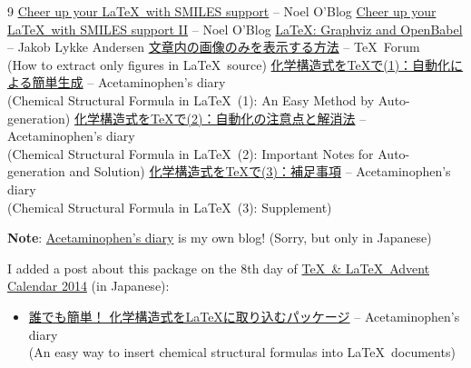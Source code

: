 \documentclass[12pt]{ltjsarticle}
\begin{document}
\begin{thebibliography}{9}
\href{http://baoilleach.blogspot.jp/2012/03/cheer-up-your-latex-with-smiles-support.html}{Cheer up your \LaTeX\ with SMILES support} -- Noel O'Blog
\href{http://baoilleach.blogspot.jp/2012/04/cheer-up-your-latex-with-smiles-support.html}{Cheer up your \LaTeX\ with SMILES support II} -- Noel O'Blog
\href{http://imada.sdu.dk/~jlandersen/}{\LaTeX: Graphviz and OpenBabel} -- Jakob Lykke Andersen
\href{http://oku.edu.mie-u.ac.jp/tex/mod/forum/discuss.php?d=1411}{文章内の画像のみを表示する方法} -- \TeX\ Forum \\
(How to extract only figures in \LaTeX\ source)
\href{http://acetaminophen.hatenablog.com/entry/2014/11/02/130624}{化学構造式を\TeX で(1)：自動化による簡単生成} -- Acetaminophen's diary \\
(Chemical Structural Formula in \LaTeX\ (1): An Easy Method by Auto-generation)
\href{http://acetaminophen.hatenablog.com/entry/2014/11/02/130624}{化学構造式を\TeX で(2)：自動化の注意点と解消法} -- Acetaminophen's diary \\
(Chemical Structural Formula in \LaTeX\ (2): Important Notes for Auto-generation and Solution)
\href{http://acetaminophen.hatenablog.com/entry/2014/11/05/135927}{化学構造式を\TeX で(3)：補足事項} -- Acetaminophen's diary \\
(Chemical Structural Formula in \LaTeX\ (3): Supplement)
\end{thebibliography}

\noindent
\textbf{Note}: \href{http://acetaminophen.hatenablog.com/}{Acetaminophen's diary} is my own blog! (Sorry, but only in Japanese)

I added a post about this package on the 8th day of \href{http://www.adventar.org/calendars/553}{\TeX\ \& \LaTeX\ Advent Calendar 2014} (in Japanese):
\begin{itemize}
\item \href{http://acetaminophen.hatenablog.com/entry/2014/12/08/053519}{誰でも簡単！ 化学構造式を\LaTeX に取り込むパッケージ} -- Acetaminophen's diary \\
(An easy way to insert chemical structural formulas into \LaTeX\ documents)
\end{itemize}
\end{document}
